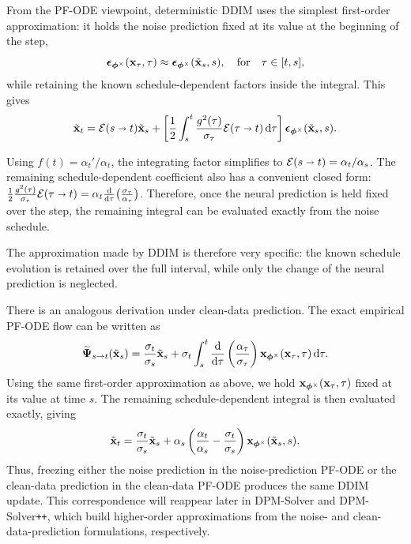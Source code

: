 From the PF-ODE viewpoint, deterministic DDIM uses the simplest first-order
approximation: it holds the noise prediction fixed at its value at the
beginning of the step,
\[
{\bm{\epsilon}}_{\bm{\phi}^\times}({\mathbf{x}}_\tau,\tau)
\approx
{\bm{\epsilon}}_{\bm{\phi}^\times}(\tilde{{\mathbf{x}}}_s,s),\quad\text{for}\quad \tau\in[t,s],
\]
 while retaining the known schedule-dependent factors
inside the integral. This gives
\begin{align*}
\tilde{{\mathbf{x}}}_t
=
\mathcal E(s\shortrightarrow t)\tilde{{\mathbf{x}}}_s
+
\left[
\frac{1}{2}
\int_s^t
\frac{g^2(\tau)}{\sigma_\tau}
\mathcal E(\tau\shortrightarrow t)
\mathop{}\!\mathrm{d}\tau
\right]
{\bm{\epsilon}}_{\bm{\phi}^\times}(\tilde{{\mathbf{x}}}_s,s).
\end{align*}

Using $f(t)=\alpha_t'/\alpha_t$, the integrating factor simplifies to
$\mathcal E(s\shortrightarrow t)=\alpha_t/\alpha_s$. The remaining
schedule-dependent coefficient also has a convenient closed form:
$\tfrac{1}{2}\tfrac{g^2(\tau)}{\sigma_\tau}
\mathcal E(\tau\shortrightarrow t)
=
\alpha_t
\tfrac{\mathop{}\!\mathrm{d}}{\mathop{}\!\mathrm{d}\tau}
\bigl(\tfrac{\sigma_\tau}{\alpha_\tau}\bigr)$.
Therefore, once the neural prediction is held fixed over the step, the
remaining integral can be evaluated exactly from the noise schedule.


The approximation made by DDIM is therefore very specific: the known
schedule evolution is retained over the full interval, while only the
change of the neural prediction is neglected.


There is an analogous derivation under clean-data prediction. The exact
empirical PF-ODE flow can be written as
\begin{align*}
\widetilde{{\bm{\Psi}}}_{s\to t}(\tilde{{\mathbf{x}}}_s)
=
\frac{\sigma_t}{\sigma_s}\tilde{{\mathbf{x}}}_s
+
\sigma_t
\int_s^t
\frac{\mathop{}\!\mathrm{d}}{\mathop{}\!\mathrm{d}\tau}
\left(
\frac{\alpha_\tau}{\sigma_\tau}
\right)
{\mathbf{x}}_{\bm{\phi}^\times}({\mathbf{x}}_\tau,\tau)
\mathop{}\!\mathrm{d}\tau.
\end{align*}
Using the same first-order approximation as above, we hold
${\mathbf{x}}_{\bm{\phi}^\times}({\mathbf{x}}_\tau,\tau)$ fixed at its value at time $s$.
The remaining schedule-dependent integral is then evaluated exactly, giving
\[
\tilde{{\mathbf{x}}}_t
=
\frac{\sigma_t}{\sigma_s}\tilde{{\mathbf{x}}}_s
+
\alpha_s
\left(
\frac{\alpha_t}{\alpha_s}
-
\frac{\sigma_t}{\sigma_s}
\right)
{\mathbf{x}}_{\bm{\phi}^\times}(\tilde{{\mathbf{x}}}_s,s).
\]
Thus, freezing either the noise prediction in the noise-prediction PF-ODE or
the clean-data prediction in the clean-data PF-ODE produces the same DDIM
update. This correspondence will reappear later in DPM-Solver and
DPM-Solver\texttt{++}, which build higher-order approximations from the noise-
and clean-data-prediction formulations, respectively.


